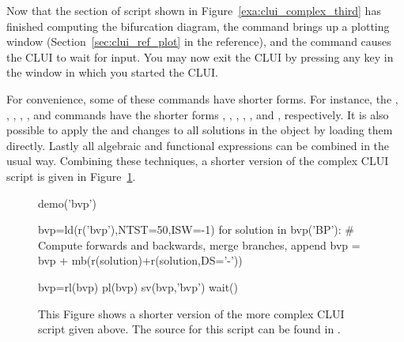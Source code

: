 \documentclass[12pt]{report}
\begin{document}
 Now that the section of script shown in 
 Figure~\ref{exa:clui_complex_third} has finished computing the
 bifurcation diagram, the command 
 brings up a plotting window 
 (Section~\ref{sec:clui_ref_plot} in the reference),
 and the command  causes the \AUTO CLUI
 to wait for input.  You may now exit the \AUTO CLUI
 by pressing any key in the window in which you started
 the \AUTO CLUI.

 For convenience, some of these commands have shorter forms.
 For instance, the , , ,
 , , and  commands
 have the shorter forms , , ,
 , , and , respectively.
 It is also possible to apply the  and  changes
 to all solutions in the  object by loading them
 directly. Lastly all algebraic and functional expressions can be
 combined in the
 usual way. Combining these techniques, a shorter version of the complex \AUTO
  CLUI script is given in Figure~\ref{exa:clui_complex_fourth}.

 \begin{figure}[htbp]
 {\small \begin{center} \begin{boxedverbatim}
 demo('bvp')

 bvp=ld(r('bvp'),NTST=50,ISW=-1)
 for solution in bvp('BP'):
     # Compute forwards and backwards, merge branches, append
     bvp = bvp + mb(r(solution)+r(solution,DS='-'))

 bvp=rl(bvp)
 pl(bvp)
 sv(bvp,'bvp')
 wait()
 \end{boxedverbatim}
 \end{center} 
 }
 \caption[A complex example of a \AUTO CLUI script.]
 {This Figure shows a shorter version of the more complex \AUTO CLUI
   script given above.
 The source for this script can be found in .
 }
 \label{exa:clui_complex_fourth}
 \end{figure}
\end{document}
